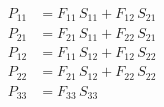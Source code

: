 \begin{align}
P_{11} &= F_{11}\,S_{11}+F_{12}\,S_{21} \\ 
P_{21} &= F_{21}\,S_{11}+F_{22}\,S_{21} \\ 
P_{12} &= F_{11}\,S_{12}+F_{12}\,S_{22} \\ 
P_{22} &= F_{21}\,S_{12}+F_{22}\,S_{22} \\ 
P_{33} &= F_{33}\,S_{33} 
\end{align}
